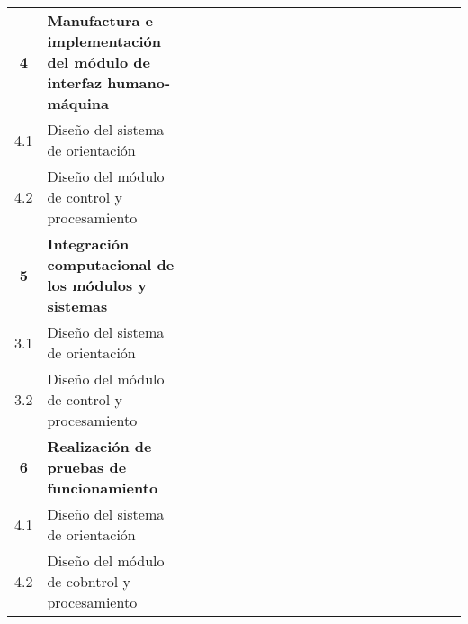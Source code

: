 \begin{table}
{\begin{tabular}{clccccccccccccccccccc}
			\hline
			\textbf{4} & \textbf{Manufactura e implementación del módulo de interfaz humano-máquina} &  &  &  &  &  &  &  &  &  &  &  &  &  &  &  &  &  &  &  \\
			4.1 & Diseño del sistema de orientación &  &  &  &  &  &  &  &  &  &  &  &  &  &  &  &  &  &  &  \\
			4.2 & Diseño del módulo de control y procesamiento &  &  &  &  &  &  &  &  &  &  &  &  &  &  &  &  &  &  &  \\
			\hline
			\textbf{5} & \textbf{Integración computacional de los módulos y sistemas} &  &  &  &  &  &  &  &  &  &  &  &  &  &  &  &  &  &  &  \\
			3.1 & Diseño del sistema de orientación &  &  &  &  &  &  &  &  &  &  &  &  &  &  &  &  &  &  &  \\
			3.2 & Diseño del módulo de control y procesamiento &  &  &  &  &  &  &  &  &  &  &  &  &  &  &  &  &  &  &  \\
			\hline
			\textbf{6} & \textbf{Realización de pruebas de funcionamiento} &  &  &  &  &  &  &  &  &  &  &  &  &  &  &  &  &  &  &  \\
			4.1 & Diseño del sistema de orientación &  &  &  &  &  &  &  &  &  &  &  &  &  &  &  &  &  &  &  \\
			4.2 & Diseño del módulo de cobntrol y procesamiento &  &  &  &  &  &  &  &  &  &  &  &  &  &  &  &  &  &  &  \\
		\end{tabular}
	}
\end{table}

